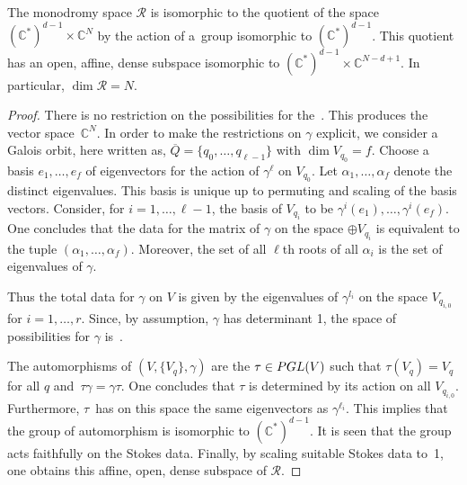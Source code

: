 \documentclass[10pt,a4paper]{amsart}
\begin{document}
\begin{Lemma} \label{lemma01} The monodromy space $\mathcal{R}$ is isomorphic to the quotient of the space $(\mathbb{C}^*)^{d-1}\times \mathbb{C}^N$ by the
 action of a~group isomorphic to $(\mathbb{C}^*)^{d-1}$. This quotient has an open, affine, dense subspace
 isomorphic to $(\mathbb{C}^*)^{d-1}\times \mathbb{C}^{N-d+1}$. In particular, $\dim \mathcal{R}=N$.
\end{Lemma}

\begin{proof} There is no restriction on the possibilities for the~. This produces the vector space~$\mathbb{C}^N$.
In order to make the restrictions on $\gamma$ explicit, we consider a Galois orbit, here written as,
$\overline{Q}=\{q_0,\dots ,q_{\ell -1}\}$ with $\dim V_{q_0}=f$. Choose a basis
$e_{1},\dots, e_{f}$ of eigenvectors for the action of $\gamma^\ell$ on $V_{q_0}$. Let $\alpha_1,\dots ,\alpha_f$ denote the
distinct eigenvalues. This basis is unique up to permuting and scaling of the basis vectors. Consider, for $i=1,\dots, \ell -1$, the basis of $V_{q_i}$ to be $\gamma ^i(e_1),\dots , \gamma ^i(e_f)$. One concludes that the data for the matrix of $\gamma$
on the space $\oplus V_{q_i}$ is equivalent to the tuple $(\alpha_1,\dots ,\alpha_f)$. Moreover, the set of all $\ell$th roots of all $\alpha _i$ is the set of eigenvalues of $\gamma$.

Thus the total data for $\gamma$ on $V$ is given by the eigenvalues of $\gamma^{l_i}$ on the space $ V_{q_{i,0}}$ for $i=1,\dots ,r$.
 Since, by assumption, $\gamma$ has determinant 1, the space of possibilities for $\gamma$ is~.


The automorphisms of $(V,\{V_q\},\gamma)$ are the $\tau \in {\rm PGL}(V)$ such that $\tau(V_q)=V_q$ for all $q$ and~${\tau \gamma=\gamma \tau}$. One concludes that $\tau$ is determined by its action on all $V_{q_{i,0}}$. Furthermore,
$\tau$~has on this space the same eigenvectors as $\gamma ^{\ell_i}$. This implies that the group of automorphism
is isomorphic to $(\mathbb{C}^*)^{d-1}$. It is seen that the group acts faithfully on the Stokes data. Finally, by scaling
suitable Stokes data to~1, one obtains this affine, open, dense subspace of $\mathcal{R}$.
\end{proof}
\end{document}
